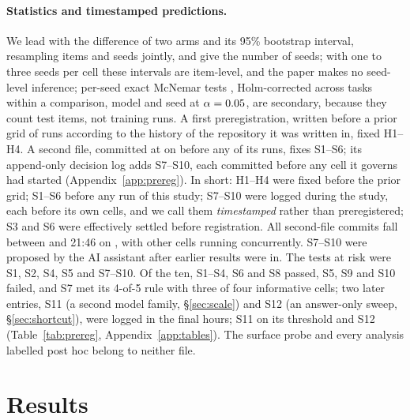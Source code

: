 \documentclass{article}
\theoremstyle{definition}
\begin{document}
\paragraph{Statistics and timestamped predictions.}
\label{sec:prereg}
We lead with the difference of two arms and its 95\% bootstrap interval, resampling items and seeds jointly, and give the number of seeds; with one to three seeds per cell these intervals are item-level, and the paper makes no seed-level inference; per-seed exact McNemar tests \citep{mcnemar1947note}, Holm-corrected \citep{holm1979simple} across tasks within a comparison, model and seed at $\alpha=0.05$, are secondary, because they count test items, not training runs. A first preregistration, written before a prior grid of \nPriorRuns{} runs according to the history of the repository it was written in, fixed H1--H4. A second file, committed at \preregTime{} on \preregDate{} before any of its runs, fixes S1--S6; its append-only decision log adds S7--S10, each committed before any cell it governs had started (Appendix~\ref{app:prereg}). In short: H1--H4 were fixed before the prior grid; S1--S6 before any run of this study; S7--S10 were logged during the study, each before its own cells, and we call them \emph{timestamped} rather than preregistered; S3 and S6 were effectively settled before registration. All second-file commits fall between \preregTime{} and 21:46 on \preregDate{}, with other cells running concurrently. S7--S10 were proposed by the AI assistant after earlier results were in. The tests at risk were S1, S2, S4, S5 and S7--S10. Of the ten, S1--S4, S6 and S8 passed, S5, S9 and S10 failed, and S7 met its 4-of-5 rule with three of four informative cells; two later entries, S11 (a second model family, \S\ref{sec:scale}) and S12 (an answer-only sweep, \S\ref{sec:shortcut}), were logged in the final hours; S11 \SElevenVerdict{} on its threshold and S12 \STwelveVerdict{} (Table~\ref{tab:prereg}, Appendix~\ref{app:tables}). The surface probe and every analysis labelled post hoc belong to neither file.

\section{Results}
\label{sec:results}
\end{document}
